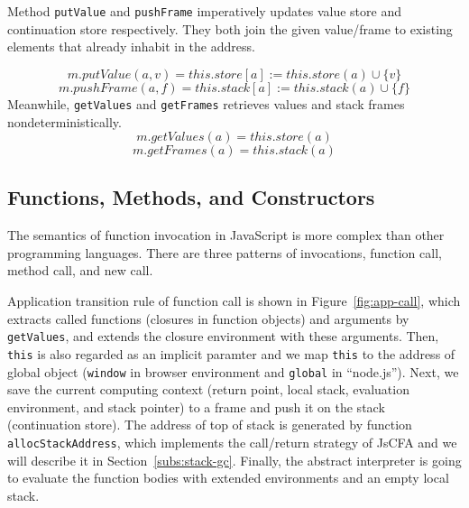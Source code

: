 \documentclass{article}
\begin{document}
Method \verb|putValue| and \verb|pushFrame| imperatively updates value store and continuation store respectively.
They both join the given value/frame to existing elements that already inhabit in the address.

\[
m.putValue(a, v) = this.store[a] := this.store(a) \cup \{v\}
\]
\[
m.pushFrame(a, f) = this.stack[a] := this.stack(a) \cup \{f\}
\]
Meanwhile, \verb|getValues| and \verb|getFrames| retrieves values and stack frames nondeterministically.
\[
m.getValues(a) = this.store(a)
\]
\[
m.getFrames(a) = this.stack(a)
\]

\subsection{Functions, Methods, and Constructors}
\label{sub:Functions, Methods, and Constructors}

The semantics of function invocation in JavaScript is more complex than other programming languages.
There are three patterns of invocations, function call, method call, and new call.

Application transition rule of function call is shown in Figure~\ref{fig:app-call}, which extracts called functions (closures in function objects) and arguments by \verb|getValues|, and extends the closure environment with these arguments. Then, \verb|this| is also regarded as an implicit paramter and we map \verb|this| to the address of global object (\verb|window| in browser environment and \verb|global| in ``node.js''). Next, we save the current computing context (return point, local stack, evaluation environment, and stack pointer) to a frame and push it on the stack (continuation store).
The address of top of stack is generated by function \verb|allocStackAddress|, which implements the call/return strategy of JsCFA and we will describe it in Section~\ref{subs:stack-gc}. Finally, the abstract interpreter is going to evaluate the function bodies with extended environments and an empty local stack.
\end{document}
